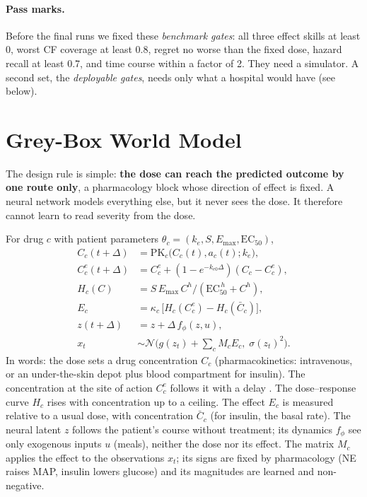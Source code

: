 \documentclass[letterpaper]{article}
\newcommand{\Emax}{E_{\max}}
\begin{document}
\paragraph{Pass marks.} Before the final runs we fixed these \emph{benchmark gates}: all three effect skills at least 0, worst CF coverage at least 0.8, regret no worse than the fixed dose, hazard recall at least 0.7, and time course within a factor of 2. They need a simulator. A second set, the \emph{deployable gates}, needs only what a hospital would have (see below).

\section{Grey-Box World Model}

The design rule is simple: \textbf{the dose can reach the predicted outcome by one route only}, a pharmacology block whose direction of effect is fixed. A neural network models everything else, but it never sees the dose. It therefore cannot learn to read severity from the dose.

For drug $c$ with patient parameters $\theta_c=(k_e, S, \Emax, \mathrm{EC}_{50})$,
\begin{align}
C_c(t+\Delta) &= \mathrm{PK}_c\big(C_c(t), a_c(t); k_e\big),\\
C^e_c(t+\Delta) &= C^e_c + (1-e^{-k_{e0}\Delta})(C_c - C^e_c),\\
H_c(C) &= S\,\Emax\, C^{h}/(\mathrm{EC}_{50}^{\,h} + C^{h}),\\
E_c &= \kappa_c\,\big[H_c(C^e_c) - H_c(\bar C_c)\big],\\
z(t+\Delta) &= z + \Delta\, f_\phi(z, u),\\
x_t &\sim \mathcal{N}\Big(g(z_t) + \textstyle\sum_c M_c E_c,\; \sigma(z_t)^2\Big).
\end{align}
In words: the dose sets a drug concentration $C_c$ (pharmacokinetics: intravenous, or an under-the-skin depot plus blood compartment for insulin). The concentration at the site of action $C^e_c$ follows it with a delay \citep{sheiner1979ke0}. The dose--response curve $H_c$ rises with concentration up to a ceiling. The effect $E_c$ is measured relative to a usual dose, with concentration $\bar C_c$ (for insulin, the basal rate). The neural latent $z$ follows the patient's course without treatment; its dynamics $f_\phi$ see only exogenous inputs $u$ (meals), neither the dose nor its effect. The matrix $M_c$ applies the effect to the observations $x_t$; its signs are fixed by pharmacology (NE raises MAP, insulin lowers glucose) and its magnitudes are learned and non-negative.
\end{document}
